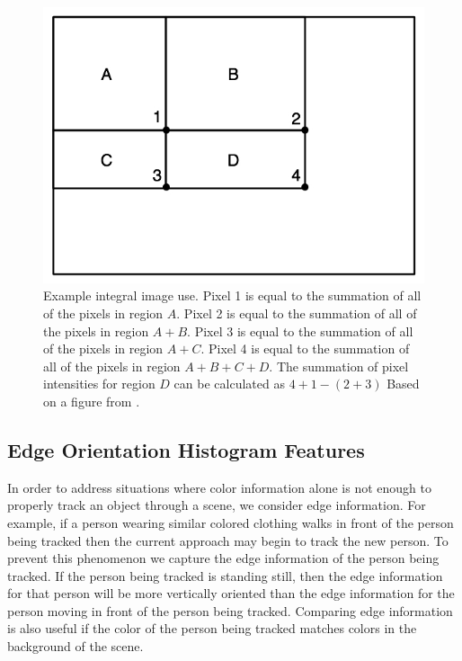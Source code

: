 \documentclass[11pt]{article}
\begin{document}
 \begin{figure}[H]
\centering
\includegraphics[scale=.4]{img/IntegralImageUse.jpg}
\caption{Example integral image use. Pixel 1 is equal to the summation of all of the pixels in region $A$. Pixel 2 is equal to the summation of all of the pixels in region $A+B$. Pixel 3 is equal to the summation of all of the pixels in region $A+C$. Pixel 4 is equal to the summation of all of the pixels in region $A+B+C+D$. The summation of pixel intensities for region $D$ can be calculated as $4+1-(2+3)$  Based on a figure from \cite{facedetection}.}
\label{fig:integralimguse}
\end{figure}


\subsection{Edge Orientation Histogram Features}
\label{sec:edgehist}

In order to address situations where color information alone is not enough to properly track an object through a scene, we consider edge information. For example, if a person wearing similar colored clothing walks in front of the person being tracked then the current approach may begin to track the new person. To prevent this phenomenon we capture the edge information of the person being tracked. If the person being tracked is standing still, then the edge information for that person will be more vertically oriented than the edge information for the person moving in front of the person being tracked. Comparing edge information is also useful if the color of the person being tracked matches colors in the background of the scene. 
\end{document}
